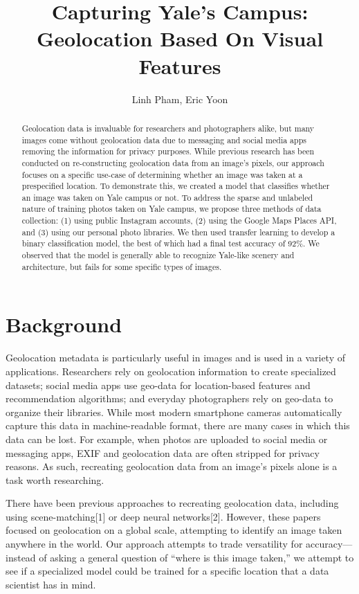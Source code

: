 \documentclass[letterpaper]{article} %
\title{Capturing Yale’s Campus: Geolocation Based On Visual Features}
\author{
    Linh Pham\equalcontrib,
    Eric Yoon\equalcontrib
}
\begin{document}
\maketitle

\begin{abstract}
Geolocation data is invaluable for researchers and photographers alike, but many images come without geolocation data due to messaging and social media apps removing the information for privacy purposes. While previous research has been conducted on re-constructing geolocation data from an image’s pixels, our approach focuses on a specific use-case of determining whether an image was taken at a prespecified location. To demonstrate this, we created a model that classifies whether an image was taken on Yale campus or not. To address the sparse and unlabeled nature of training photos taken on Yale campus, we propose three methods of data collection: (1) using public Instagram accounts, (2) using the Google Maps Places API, and (3) using our personal photo libraries. We then used transfer learning to develop a binary classification model, the best of which had a final test accuracy of 92\%. We observed that the model is generally able to recognize Yale-like scenery and architecture, but fails for some specific types of images.
\end{abstract}

\section{Background}
Geolocation metadata is particularly useful in images and is used in a variety of applications. Researchers rely on geolocation information to create specialized datasets; social media apps use geo-data for location-based features and recommendation algorithms; and everyday photographers rely on geo-data to organize their libraries. While most modern smartphone cameras automatically capture this data in machine-readable format, there are many cases in which this data can be lost. For example, when photos are uploaded to social media or messaging apps, EXIF and geolocation data are often stripped for privacy reasons. As such, recreating geolocation data from an image’s pixels alone is a task worth researching.

There have been previous approaches to recreating geolocation data, including using scene-matching[1] or deep neural networks[2]. However, these papers focused on geolocation on a global scale, attempting to identify an image taken anywhere in the world. Our approach attempts to trade versatility for accuracy—instead of asking a general question of “where is this image taken,” we attempt to see if a specialized model could be trained for a specific location that a data scientist has in mind.
\end{document}
